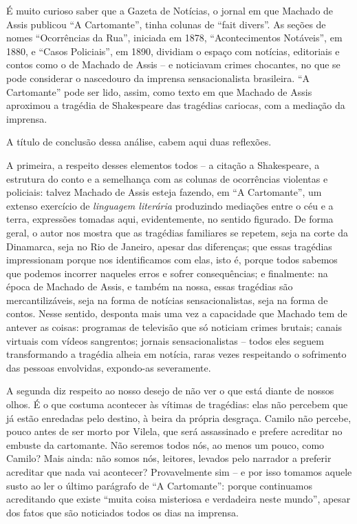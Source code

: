 \documentclass{extarticle}
\begin{document}

É muito curioso saber que a Gazeta de Notícias, o jornal em que Machado
de Assis publicou ``A Cartomante'', tinha colunas de ``fait divers''. As
seções de nomes ``Ocorrências da Rua'', iniciada em 1878,
``Acontecimentos Notáveis'', em 1880, e ``Casos Policiais'', em 1890,
dividiam o espaço com notícias, editoriais e contos como o de Machado de
Assis -- e noticiavam crimes chocantes, no que se pode considerar o
nascedouro da imprensa sensacionalista brasileira. ``A Cartomante'' pode
ser lido, assim, como texto em que Machado de Assis aproximou a tragédia
de Shakespeare das tragédias cariocas, com a mediação da imprensa.

A título de conclusão dessa análise, cabem aqui duas reflexões.

A primeira, a respeito desses elementos todos -- a citação a
Shakespeare, a estrutura do conto e a semelhança com as colunas de
ocorrências violentas e policiais: talvez Machado de Assis esteja
fazendo, em ``A Cartomante'', um extenso exercício de \emph{linguagem
literária} produzindo mediações entre o céu e a terra, expressões
tomadas aqui, evidentemente, no sentido figurado. De forma geral, o
autor nos mostra que as tragédias familiares se repetem, seja na corte
da Dinamarca, seja no Rio de Janeiro, apesar das diferenças; que essas
tragédias impressionam porque nos identificamos com elas, isto é, porque
todos sabemos que podemos incorrer naqueles erros e sofrer
consequências; e finalmente: na época de Machado de Assis, e também na
nossa, essas tragédias são mercantilizáveis, seja na forma de notícias
sensacionalistas, seja na forma de contos. Nesse sentido, desponta mais
uma vez a capacidade que Machado tem de antever as coisas: programas de
televisão que só noticiam crimes brutais; canais virtuais com vídeos
sangrentos; jornais sensacionalistas -- todos eles seguem transformando
a tragédia alheia em notícia, raras vezes respeitando o sofrimento das
pessoas envolvidas, expondo-as severamente.

A segunda diz respeito ao nosso desejo de não ver o que está diante de
nossos olhos. É o que costuma acontecer às vítimas de tragédias: elas
não percebem que já estão enredadas pelo destino, à beira da própria
desgraça. Camilo não percebe, pouco antes de ser morto por Vilela, que
será assassinado e prefere acreditar no embuste da cartomante. Não
seremos todos nós, ao menos um pouco, como Camilo? Mais ainda: não somos
nós, leitores, levados pelo narrador a preferir acreditar que nada vai
acontecer? Provavelmente sim -- e por isso tomamos aquele susto ao ler o
último parágrafo de ``A Cartomante'': porque continuamos acreditando que
existe ``muita coisa misteriosa e verdadeira neste mundo'', apesar dos
fatos que são noticiados todos os dias na imprensa.
\end{document}
